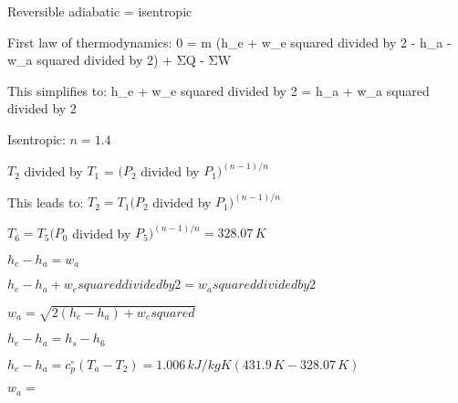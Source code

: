 Reversible adiabatic = isentropic  

First law of thermodynamics:  
0 = m (h_e + w_e squared divided by 2 - h_a - w_a squared divided by 2) + ΣQ - ΣW  

This simplifies to:  
h_e + w_e squared divided by 2 = h_a + w_a squared divided by 2  

Isentropic: \( n = 1.4 \)  

\( T_2 \) divided by \( T_1 \) = \( (P_2 \) divided by \( P_1)^{(n-1)/n} \)  

This leads to:  
\( T_2 = T_1 (P_2 \) divided by \( P_1)^{(n-1)/n} \)  

\( T_6 = T_5 (P_0 \) divided by \( P_5)^{(n-1)/n} = 328.07 \, K \)  

\( h_e - h_a = w_a \)  

\( h_e - h_a + w_e squared divided by 2 = w_a squared divided by 2 \)  

\( w_a = \sqrt{2 (h_e - h_a) + w_e squared} \)  

\( h_e - h_a = h_s - h_6 \)  

\( h_e - h_a = c_p^{\circ} (T_a - T_2) = 1.006 \, kJ/kgK (431.9 \, K - 328.07 \, K) \)  

\( w_a = \)